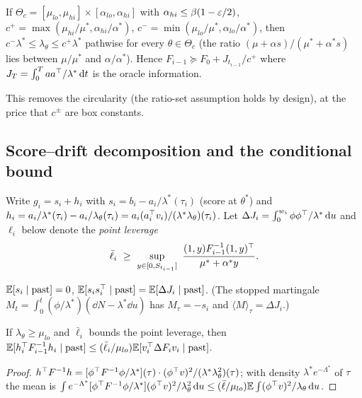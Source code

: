 \begin{proposition}\label{prop:ratio}\Pt{}
If $\Theta_c=[\mu_{lo},\mu_{hi}]\times[\alpha_{lo},\alpha_{hi}]$ with $\alpha_{hi}\le\beta(1-\varepsilon/2)$, $c^+=\max(\mu_{hi}/\mu^*,\alpha_{hi}/\alpha^*)$, $c^-=\min(\mu_{lo}/\mu^*,\alpha_{lo}/\alpha^*)$, then $c^-\lambda^*\le\lambda_\theta\le c^+\lambda^*$ pathwise for every $\theta\in\Theta_c$ (the ratio $(\mu+\alpha s)/(\mu^*+\alpha^*s)$ lies between $\mu/\mu^*$ and $\alpha/\alpha^*$). Hence $F_{i-1}\succeq F_0+J_{t_{i-1}}/c^+$ where $J_T=\int_0^Taa^{\top}/\lambda^*\,\mathrm d t$ is the oracle information.
\end{proposition}
This removes the circularity (the ratio-set assumption holds by design), at the price that $c^\pm$ are box constants.

\subsection{Score--drift decomposition and the conditional bound}

Write $g_i=s_i+h_i$ with $s_i=b_i-a_i/\lambda^*(\tau_i)$ (score at $\theta^*$) and $h_i=a_i/\lambda^*(\tau_i)-a_i/\lambda_\theta(\tau_i)=a_i(a_i^{\top} v_i)/(\lambda^*\lambda_\theta)(\tau_i)$.
Let $\Delta J_i=\int_0^{w_i}\phi\phi^{\top}/\lambda^*\,\mathrm d u$ and $\ell_i$ below denote the \emph{point leverage}
\[
\bar\ell_i\ \ge\ \sup_{y\in[0,S_{t_{i-1}}]}\ \frac{(1,y)F_{i-1}^{-1}(1,y)\T}{\mu^*+\alpha^*y}.
\]

\begin{lemma}[score is centred, covariance $=\Delta J$]\label{lem:score}\Pt{}
$\mathbb{E}[s_i\mid\text{past}]=0$, $\mathbb{E}[s_is_i^{\top}\mid\text{past}]=\mathbb{E}[\Delta J_i\mid\text{past}]$.
(The stopped martingale $M_t=\int_0^t(\phi/\lambda^*)(\dd N-\lambda^*\dd u)$ has $M_\tau=-s_i$ and $\langle M\rangle_\tau=\Delta J_i$.)
\end{lemma}

\begin{lemma}\label{lem:drift}\Pt{}
If $\lambda_\theta\ge\mu_{lo}$ and $\bar\ell_i$ bounds the point leverage, then $\mathbb{E}[h_i^{\top} F_{i-1}^{-1}h_i\mid\text{past}]\le(\bar\ell_i/\mu_{lo})\mathbb{E}[v_i^{\top}\Delta F_iv_i\mid\text{past}]$.
\end{lemma}
\begin{proof}
$h^{\top} F^{-1}h=[\phi^{\top} F^{-1}\phi/\lambda^*](\tau)\cdot(\phi^{\top} v)^2/(\lambda^*\lambda_\theta^2)(\tau)$; with density $\lambda^*e^{-\Lambda^*}$ of $\tau$ the mean is $\int e^{-\Lambda^*}[\phi^{\top} F^{-1}\phi/\lambda^*](\phi^{\top} v)^2/\lambda_\theta^2\,\mathrm d u\le(\bar\ell/\mu_{lo})\mathbb{E}\int(\phi^{\top} v)^2/\lambda_\theta\,\mathrm d u$.
\end{proof}

